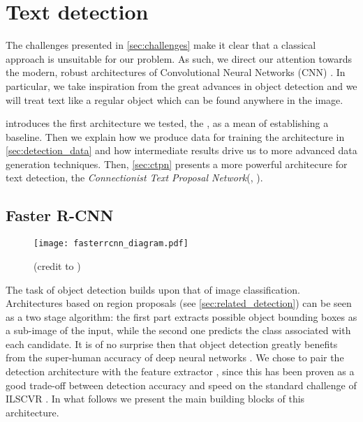 
\chapter{Text detection}
\label{ch:detection}

The challenges presented in \autoref{sec:challenges} make it clear that a classical approach is unsuitable for our problem. As such, we direct our attention towards the modern, robust architectures of Convolutional Neural Networks (CNN) \citep{leCun_CNN}. In particular, we take inspiration from the great advances in object detection and we will treat text like a regular object which can be found anywhere in the image.

 introduces the first architecture we tested, the \FRCNN{} \citep{faster_rcnn}, as a mean of establishing a baseline. Then we explain how we produce data for training the architecture in \autoref{sec:detection_data} and how intermediate results drive us to more advanced data generation techniques. Then, \autoref{sec:ctpn} presents a more powerful architecure for text detection, the \emph{Connectionist Text Proposal Network}(\CTPN{}, \citet{ctpn}). 



\section{Faster R-CNN}\label{sec:faster_rcnn}

	\begin{figure}
		\centering
		\texttt{[image: fasterrcnn\_diagram.pdf]}
		\caption[The \FRCNN{} architecture]{(credit to \cite{detection_benchmark}) \label{fig:faster_rcnn}}
	\end{figure}

	The task of object detection builds upon that of image classification. Architectures based on region proposals (see \autoref{sec:related_detection}) can be seen as a two stage algorithm: the first part extracts possible object bounding boxes as a sub-image of the input, while the second one predicts the class associated with each candidate. It is of no surprise then that object detection greatly benefits from the super-human accuracy of deep neural networks \citep{superhuman_classif}. We chose to pair the \FRCNN{} detection architecture with the \RESNET{} feature extractor \citep{resnet}, since this has been proven as a good trade-off between detection accuracy and speed on the standard challenge of ILSCVR \citep{detection_benchmark}. In what follows we present the main building blocks of this architecture.


